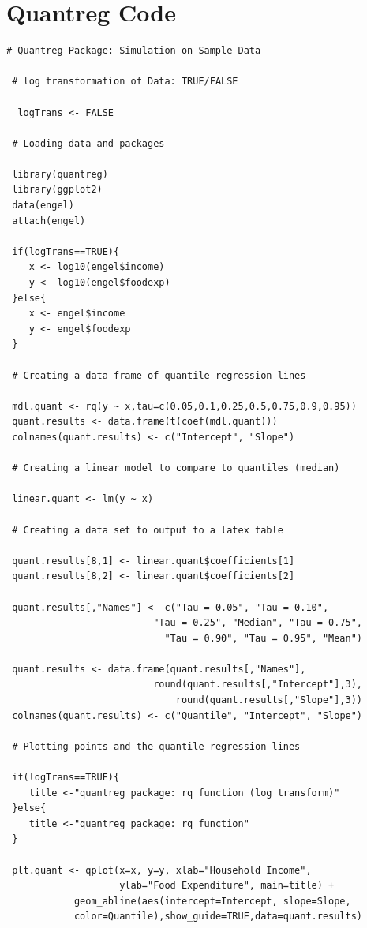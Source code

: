\documentclass[12pt,a4paper]{report}
\begin{document}
\section{Quantreg Code}\label{App:Engel-Code-Quantreg}
\begin{lstlisting}
# Quantreg Package: Simulation on Sample Data

 # log transformation of Data: TRUE/FALSE

  logTrans <- FALSE

 # Loading data and packages

 library(quantreg)
 library(ggplot2)
 data(engel)
 attach(engel)

 if(logTrans==TRUE){
    x <- log10(engel$income)
    y <- log10(engel$foodexp)
 }else{
    x <- engel$income
    y <- engel$foodexp
 }

 # Creating a data frame of quantile regression lines

 mdl.quant <- rq(y ~ x,tau=c(0.05,0.1,0.25,0.5,0.75,0.9,0.95))
 quant.results <- data.frame(t(coef(mdl.quant)))
 colnames(quant.results) <- c("Intercept", "Slope")

 # Creating a linear model to compare to quantiles (median)

 linear.quant <- lm(y ~ x)

 # Creating a data set to output to a latex table

 quant.results[8,1] <- linear.quant$coefficients[1]
 quant.results[8,2] <- linear.quant$coefficients[2]

 quant.results[,"Names"] <- c("Tau = 0.05", "Tau = 0.10",
                          "Tau = 0.25", "Median", "Tau = 0.75",
                            "Tau = 0.90", "Tau = 0.95", "Mean")

 quant.results <- data.frame(quant.results[,"Names"],
                          round(quant.results[,"Intercept"],3),
                              round(quant.results[,"Slope"],3))
 colnames(quant.results) <- c("Quantile", "Intercept", "Slope")

 # Plotting points and the quantile regression lines

 if(logTrans==TRUE){
    title <-"quantreg package: rq function (log transform)"
 }else{
    title <-"quantreg package: rq function"
 }

 plt.quant <- qplot(x=x, y=y, xlab="Household Income",
                    ylab="Food Expenditure", main=title) +
            geom_abline(aes(intercept=Intercept, slope=Slope,
            color=Quantile),show_guide=TRUE,data=quant.results)
\end{lstlisting}
\end{document}
